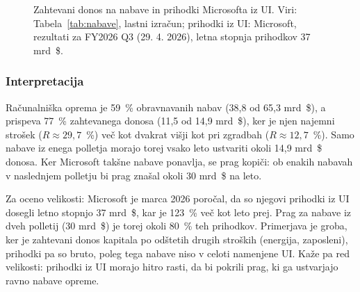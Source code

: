 \documentclass[12pt,a4paper]{article}
\begin{document}
\begin{figure}[htbp]
\centering
{}
\caption{Zahtevani donos na nabave in prihodki Microsofta iz UI. Viri: Tabela~\ref{tab:nabave}, lastni izračun; prihodki iz UI: Microsoft, rezultati za FY2026 Q3 (29. 4. 2026), letna stopnja prihodkov 37 mrd~\$.}
\label{fig:zahtevani_donos}
\end{figure}

\subsubsection{Interpretacija}

Računalniška oprema je 59~\% obravnavanih nabav (38,8 od 65,3 mrd~\$), a prispeva 77~\% zahtevanega donosa (11,5 od 14,9 mrd~\$), ker je njen najemni strošek ($R \approx 29{,}7$~\%) več kot dvakrat višji kot pri zgradbah ($R \approx 12{,}7$~\%). Samo nabave iz enega polletja morajo torej vsako leto ustvariti okoli 14,9 mrd~\$ donosa. Ker Microsoft takšne nabave ponavlja, se prag kopiči: ob enakih nabavah v naslednjem polletju bi prag znašal okoli 30 mrd~\$ na leto.

Za oceno velikosti: Microsoft je marca 2026 poročal, da so njegovi prihodki iz UI dosegli letno stopnjo 37 mrd~\$, kar je 123~\% več kot leto prej. Prag za nabave iz dveh polletij (30 mrd~\$) je torej okoli 80~\% teh prihodkov. Primerjava je groba, ker je zahtevani donos kapitala po odštetih drugih stroških (energija, zaposleni), prihodki pa so bruto, poleg tega nabave niso v celoti namenjene UI. Kaže pa red velikosti: prihodki iz UI morajo hitro rasti, da bi pokrili prag, ki ga ustvarjajo ravno nabave opreme.
\end{document}

